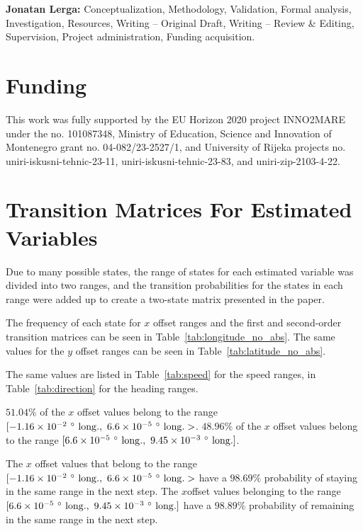 \documentclass[preprint,12pt]{elsarticle}
\begin{document}
\textbf{Jonatan Lerga:} Conceptualization, Methodology, Validation, Formal analysis, Investigation, Resources, Writing -- Original Draft, Writing -- Review \& Editing, Supervision, Project administration, Funding acquisition.

\section*{Funding}
This work was fully supported by the EU Horizon 2020 project INNO2MARE under the no. 101087348, Ministry of Education, Science and Innovation of Montenegro grant no. 04-082/23-2527/1, and University of Rijeka projects no. uniri-iskusni-tehnic-23-11, uniri-iskusni-tehnic-23-83, and uniri-zip-2103-4-22.

\appendix
\section{Transition Matrices For Estimated Variables}
\label{sec:Transition}

Due to many possible states, the range of states for each estimated variable was divided into two ranges, and the transition probabilities for the states in each range were added up to create a two-state matrix presented in the paper.

The frequency of each state for $x$ offset ranges and the first and second-order transition matrices can be seen in Table~\ref{tab:longitude_no_abs}. The same values for the $y$ offset ranges can be seen in Table~\ref{tab:latitude_no_abs}.

The same values are listed in Table~\ref{tab:speed} for the speed ranges, in Table~\ref{tab:direction} for the heading ranges.

$51.04\%$ of the $x$ offset values belong to the range $[-1.16 \times 10^{-2} \ \degree \ \mathrm{long.}, \ 6.6 \times 10^{-5} \ \degree \ \mathrm{long.}>$. $48.96\%$ of the $x$ offset values belong to the range $[6.6 \times 10^{-5} \ \degree \ \mathrm{long.}, \ 9.45 \times 10^{-3} \ \degree \ \mathrm{long.}]$. 

The $x$ offset values that belong to the range $[-1.16 \times 10^{-2} \ \degree \ \mathrm{long.}, \ 6.6 \times 10^{-5} \ \degree \ \mathrm{long.}>$ have a $98.69\%$ probability of staying in the same range in the next step. The $x$offset values belonging to the range $[6.6 \times 10^{-5} \ \degree \ \mathrm{long.}, \ 9.45 \times 10^{-3} \ \degree \ \mathrm{long.}]$ have a $98.89\%$ probability of remaining in the same range in the next step.
\end{document}
